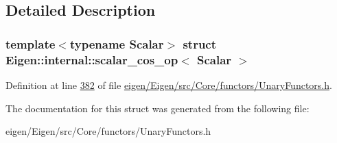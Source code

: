 \subsection{Detailed Description}
\subsubsection*{template$<$typename Scalar$>$\newline
struct Eigen\+::internal\+::scalar\+\_\+cos\+\_\+op$<$ Scalar $>$}



Definition at line \hyperlink{eigen_2_eigen_2src_2_core_2functors_2_unary_functors_8h_source_l00382}{382} of file \hyperlink{eigen_2_eigen_2src_2_core_2functors_2_unary_functors_8h_source}{eigen/\+Eigen/src/\+Core/functors/\+Unary\+Functors.\+h}.



The documentation for this struct was generated from the following file\+:\begin{DoxyCompactItemize}
\item 
eigen/\+Eigen/src/\+Core/functors/\+Unary\+Functors.\+h\end{DoxyCompactItemize}
